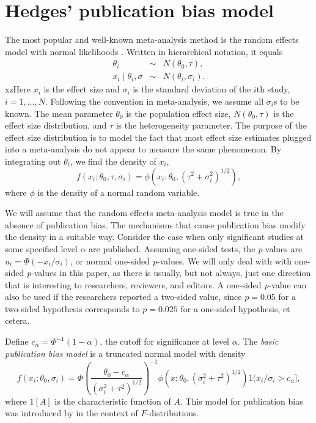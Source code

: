 \documentclass[article]{ajs}
\numberwithin{equation}{section}
\numberwithin{figure}{section}
\theoremstyle{plain}
\theoremstyle{definition}
\theoremstyle{definition}
\theoremstyle{plain}
\renewcommand{\sqrt}[1]{{(#1)^{1/2}}}
\begin{document}
\section{Hedges' publication bias model}

The most popular and well-known meta-analysis method is the random effects model with normal likelihoods \citep{hedges1998fixed}. Written in hierarchical notation, it equals
\begin{eqnarray*}
\theta_{i} & \sim & N(\theta_{0},\tau),\\
x_{i}\mid\theta_{i},\sigma & \sim & N(\theta_{i},\sigma_{i}).
\end{eqnarray*}
xzHere $x_{i}$ is the effect size and $\sigma_{i}$ is the standard deviation of the $i$th study,  $i=1,\ldots,N$. Following the convention in meta-analysis, we assume all $\sigma_{i}$s to be known. The mean parameter $\theta_0$ is the population effect size, $N(\theta_{0},\tau)$ is the effect size distribution, and $\tau$ is the heterogeneity parameter. The purpose of the effect size distribution is to model the fact that most effect size estimates plugged into a meta-analysis do not appear to measure the same phenomenon. By integrating out $\theta_{i}$, we find the density of $x_{i}$,
\[
f(x_{i};\theta_{0},\tau,\sigma_{i})=\phi(x_{i};\theta_{0},\sqrt{\tau^{2}+\sigma_{i}^{2}}),
\]
where $\phi$ is the density of a normal random variable. 

We will assume that the random effects meta-analysis model is true in the absence of publication bias. The mechanisms that cause publication bias modify the density in a suitable way. Consider the case when only significant studies at some specified level $\alpha$ are published. Assuming one-sided tests, the \textit{p}-values are $u_{i}=\Phi(-x_{i}/\sigma_{i})$, or normal one-sided \textit{p}-values. We will only deal with with one-sided \textit{p}-values in this paper, as there is usually, but not always, just one direction that is interesting to researchers, reviewers, and editors. A one-sided \textit{p}-value can also be used if the researchers reported a two-sided value, since $p=0.05$ for a two-sided hypothesis corresponds to $p=0.025$ for a one-sided hypothesis, et cetera.

Define $c_{\alpha}=\Phi^{-1}(1-\alpha)$, the cutoff for significance at level $\alpha$. The \emph{basic publication bias model} is a truncated normal model with density
\begin{equation}
f(x_{i};\theta_{0},\sigma_{i})=\Phi\left(\frac{\theta_{0}-c_{\alpha}}{\sqrt{\sigma_{i}^{2}+\tau^{2}}}\right)^{-1}\phi(x;\theta_{0},\sqrt{\sigma_{i}^{2}+\tau^{2}})1(x_{i}/\sigma_{i}>c_{\alpha}],\label{eq:selection for significance model}
\end{equation}
where $1[A]$ is the characteristic function of $A$. This model for publication bias was introduced by \citet{hedges1984estimation} in the context of $F$-distributions.
\end{document}
